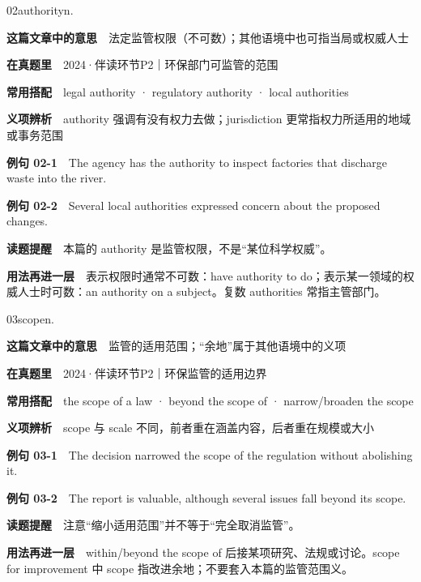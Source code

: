 \documentclass[a4paper,11pt,openany]{report}
\newcommand{\emphasislabel}[1]{\textcolor{leaf}{\CJKsf\bfseries #1}}
\begin{document}
\begin{vocabbox}{02}{authority}{n.}

\textbf{这篇文章中的意思}　法定监管权限（不可数）；其他语境中也可指当局或权威人士

\textbf{在真题里}　2024·伴读环节P2｜环保部门可监管的范围

\textbf{常用搭配}　legal authority · regulatory authority · local authorities

\textbf{义项辨析}　authority 强调有没有权力去做；jurisdiction 更常指权力所适用的地域或事务范围

\textbf{例句 02-1}　The agency has the authority to inspect factories that discharge waste into the river.

\textbf{例句 02-2}　Several local authorities expressed concern about the proposed changes.

\emphasislabel{读题提醒}　本篇的 authority 是监管权限，不是``某位科学权威''。

\textbf{用法再进一层}　表示权限时通常不可数：have authority to do；表示某一领域的权威人士时可数：an authority on a subject。复数 authorities 常指主管部门。

\end{vocabbox}

\begin{vocabbox}{03}{scope}{n.}

\textbf{这篇文章中的意思}　监管的适用范围；``余地''属于其他语境中的义项

\textbf{在真题里}　2024·伴读环节P2｜环保监管的适用边界

\textbf{常用搭配}　the scope of a law · beyond the scope of · narrow/broaden the scope

\textbf{义项辨析}　scope 与 scale 不同，前者重在涵盖内容，后者重在规模或大小

\textbf{例句 03-1}　The decision narrowed the scope of the regulation without abolishing it.

\textbf{例句 03-2}　The report is valuable, although several issues fall beyond its scope.

\emphasislabel{读题提醒}　注意``缩小适用范围''并不等于``完全取消监管''。

\textbf{用法再进一层}　within/beyond the scope of 后接某项研究、法规或讨论。scope for improvement 中 scope 指改进余地；不要套入本篇的监管范围义。

\end{vocabbox}
\end{document}
